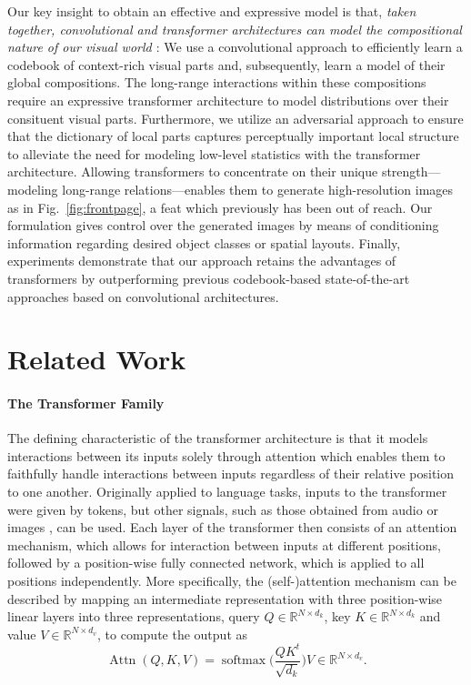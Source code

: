 \documentclass[final]{cvpr}
\newcommand{\RR}{\mathbb{R}}
\begin{document}
Our key insight to obtain an effective and expressive model is that, \emph{taken
together, convolutional and transformer architectures can model
%
%
the compositional nature of our visual world \cite{ommer2007learning}}: We use a
convolutional approach to efficiently learn a codebook of context-rich visual parts
and, subsequently, learn a model of their global compositions.
The long-range interactions within these compositions require
an expressive transformer architecture to model distributions over their consituent
visual parts. Furthermore, we utilize an adversarial approach to ensure that the dictionary of local parts captures perceptually important local structure to alleviate the need for modeling low-level
statistics with the transformer architecture. 
%
Allowing transformers to concentrate on their unique strength---modeling
long-range relations---enables them
to generate high-resolution images as in
Fig.~\ref{fig:frontpage}, a
%
feat which previously has been out of reach. Our formulation%
gives control over the generated images by means of conditioning information
regarding desired object classes or spatial layouts. Finally, experiments
demonstrate that our approach retains the advantages of transformers by
outperforming previous codebook-based state-of-the-art approaches based on convolutional
architectures.

\section{Related Work}
%
%
%
\newcommand{\seqlength}{n}
\paragraph{The Transformer Family}
The defining characteristic of the transformer architecture
\cite{vaswani2017attention} is that it models interactions between its inputs
solely through attention
\cite{bahdanau2016neural,kim2017structured,parikh2016decomposable} which
enables them to faithfully handle interactions between inputs regardless of
their relative position to one another.
%
%
Originally applied to language tasks, inputs to the transformer were given by tokens,
but other signals, such as those obtained from audio \cite{li2019neural} or images
\cite{chen2020generative},
can be used. Each layer of the transformer then consists of an attention
mechanism, which allows for interaction between inputs at different positions,
followed by a position-wise fully connected network, which is applied to all positions
independently. More specifically, the (self-)attention mechanism can be described by mapping an intermediate representation with three position-wise linear layers into three representations, query $Q \in \RR^{N\times d_k}$, key $K \in \RR^{N\times d_k}$
and value $V \in \RR^{N\times d_v}$, to compute the output as
\newcommand{\Attn}{\operatorname{Attn}}
\newcommand{\softmax}{\operatorname{softmax}}
\begin{equation}
  \Attn(Q,K,V) = \softmax\Big(\frac{QK^t}{\sqrt{d_k}}\Big)V \in
  \RR^{N\times d_v}.
\end{equation}
\end{document}
